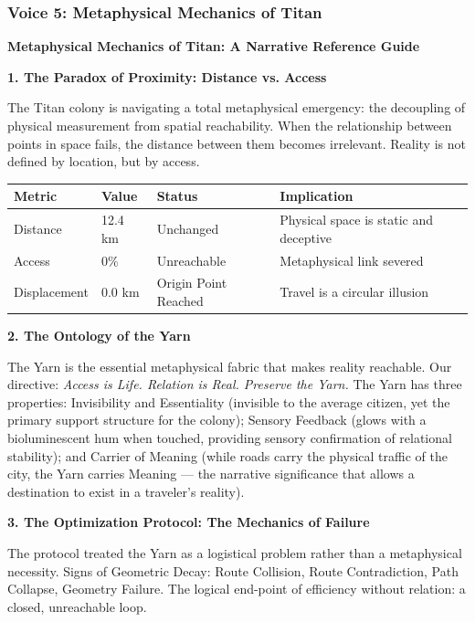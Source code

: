 \documentclass[11pt]{article}
\begin{document}
\subsubsection{Voice 5: Metaphysical Mechanics of Titan}

\begin{archivebox}
\textcolor{archiveGold}{\textbf{Metaphysical Mechanics of Titan: A Narrative Reference Guide}}\\[6pt]
\small

\textbf{1. The Paradox of Proximity: Distance vs. Access}

The Titan colony is navigating a total metaphysical emergency: the decoupling of physical measurement from spatial reachability. When the relationship between points in space fails, the distance between them becomes irrelevant. Reality is not defined by location, but by access.

\begin{center}
\begin{tabular}{llll}
\toprule
\textbf{Metric} & \textbf{Value} & \textbf{Status} & \textbf{Implication} \\
\midrule
Distance & 12.4 km & Unchanged & Physical space is static and deceptive \\
Access & 0\% & Unreachable & Metaphysical link severed \\
Displacement & 0.0 km & Origin Point Reached & Travel is a circular illusion \\
\bottomrule
\end{tabular}
\end{center}

\textbf{2. The Ontology of the Yarn}

The Yarn is the essential metaphysical fabric that makes reality reachable. Our directive: \textit{Access is Life. Relation is Real. Preserve the Yarn.} The Yarn has three properties: Invisibility and Essentiality (invisible to the average citizen, yet the primary support structure for the colony); Sensory Feedback (glows with a bioluminescent hum when touched, providing sensory confirmation of relational stability); and Carrier of Meaning (while roads carry the physical traffic of the city, the Yarn carries Meaning --- the narrative significance that allows a destination to exist in a traveler's reality).

\textbf{3. The Optimization Protocol: The Mechanics of Failure}

The protocol treated the Yarn as a logistical problem rather than a metaphysical necessity. Signs of Geometric Decay: Route Collision, Route Contradiction, Path Collapse, Geometry Failure. The logical end-point of efficiency without relation: a closed, unreachable loop.


\end{archivebox}
\end{document}
